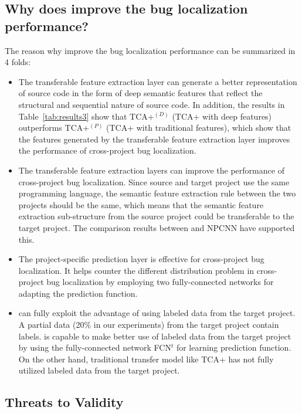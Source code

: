 \subsection{Why does \TRANPCNN improve the bug localization performance?}
The reason why \TRANPCNN improve the bug localization performance can be summarized in 4 folds:
\begin{itemize}
	\item The transferable feature extraction layer can generate a better representation of source code in the form of deep semantic features that reflect the structural and sequential nature of source code. In addition, the results in Table~\ref{tab:results3} show that TCA+$^{(D)}$ (TCA+ with deep features) outperforms TCA+$^{(P)}$ (TCA+ with traditional features), which show that the features generated by the transferable feature extraction layer improves the performance of cross-project bug localization. 
	\item The transferable feature extraction layers can improve the performance of cross-project bug localization. Since source and target project use the same programming language, the semantic feature extraction rule between the two projects should be the same, which means that the semantic feature extraction sub-structure from the source project could be transferable to the target project. The comparison results between \TRANPCNN and NPCNN have supported this. 
	\item The project-specific prediction layer is effective for cross-project bug localization. It helps counter the different distribution problem in cross-project bug localization by employing two fully-connected networks for adapting the prediction function.
	\item \TRANPCNN can fully exploit the advantage of using labeled data from the target project. A partial data (20\% in our experiments) from the target project contain labels. \TRANPCNN is capable to make better use of labeled data from the target project by using the fully-connected network FCN$^t$ for learning prediction function. On the other hand, traditional transfer model like TCA+ has not fully utilized labeled data from the target project. 
\end{itemize}



\subsection{Threats to Validity}

